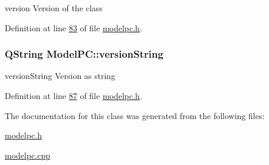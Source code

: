 version Version of the class 



Definition at line \hyperlink{modelpc_8h_source_l00083}{83} of file \hyperlink{modelpc_8h_source}{modelpc.\-h}.

\hypertarget{class_model_p_c_a5f426725ccf7eefd3c77ea8c720264c9}{
\subsubsection[{version\-String}]{\setlength{\rightskip}{0pt plus 5cm}Q\-String Model\-P\-C\-::version\-String}}\label{class_model_p_c_a5f426725ccf7eefd3c77ea8c720264c9}


version\-String Version as string 



Definition at line \hyperlink{modelpc_8h_source_l00087}{87} of file \hyperlink{modelpc_8h_source}{modelpc.\-h}.



The documentation for this class was generated from the following files\-:\begin{DoxyCompactItemize}
\item 
\hyperlink{modelpc_8h}{modelpc.\-h}\item 
\hyperlink{modelpc_8cpp}{modelpc.\-cpp}\end{DoxyCompactItemize}
